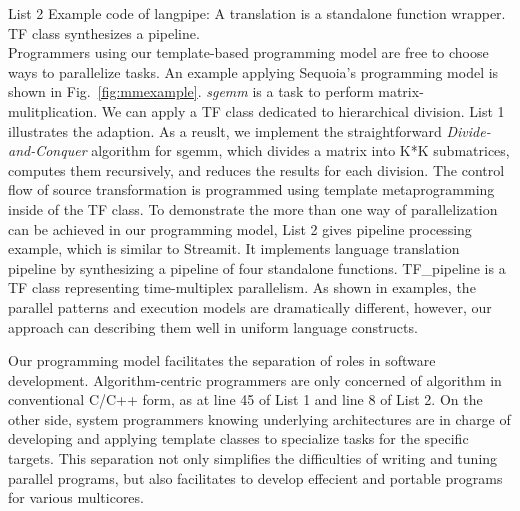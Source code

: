 List 2  Example code of langpipe: A translation is a standalone
function wrapper. TF class synthesizes a pipeline. \\

Programmers using our template-based programming model are free to
choose ways to parallelize tasks. An example applying 
Sequoia's programming model is shown in Fig.~\ref{fig:mmexample}. 
\textit{sgemm} is a task to perform matrix-mulitplication. 
We can apply a TF class dedicated to hierarchical division.  List 1
illustrates the adaption. As a reuslt, we
implement the straightforward \emph{Divide-and-Conquer} algorithm for
sgemm, which divides a matrix into K*K
submatrices, computes them recursively, and reduces the results for
each division.
The control flow of source transformation is programmed
using template metaprogramming inside of the TF class. 
To demonstrate the more than one way of parallelization can be
achieved in our programming model, List 2 gives pipeline processing example, which is similar to Streamit. It implements language translation pipeline by
synthesizing a pipeline of four standalone functions. TF\_pipeline is a TF class
representing time-multiplex parallelism. As shown in examples,
the parallel patterns and execution models are dramatically
different, however, our approach can describing them well in uniform
language constructs.

Our programming model facilitates the separation of roles in software
development. Algorithm-centric programmers are only concerned of algorithm
in conventional C/C++ form, as at line 45 of List 1 and line 8 of
List 2. On the other side,  system programmers knowing underlying
architectures are in charge of developing and
applying template classes to specialize tasks for the specific
targets. This separation not only simplifies the difficulties of writing and
tuning parallel programs, but also facilitates to develop effecient and
portable programs for various multicores.


